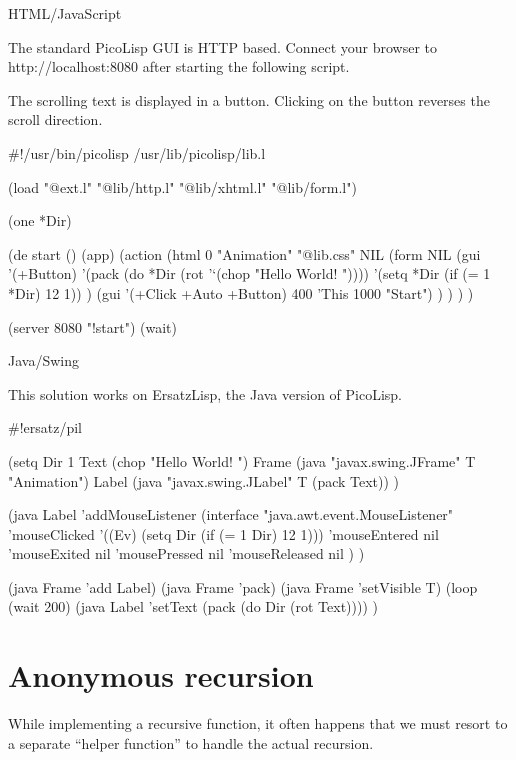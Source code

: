 \begin{wideverbatim}

HTML/JavaScript

The standard PicoLisp GUI is HTTP based. Connect your browser to
http://localhost:8080 after starting the following script.

The scrolling text is displayed in a button. Clicking on the button
reverses the scroll direction.

#!/usr/bin/picolisp /usr/lib/picolisp/lib.l

(load "@ext.l" "@lib/http.l" "@lib/xhtml.l" "@lib/form.l")

(one *Dir)

(de start ()
   (app)
   (action
      (html 0 "Animation" "@lib.css" NIL
         (form NIL
            (gui '(+Button)
               '(pack (do *Dir (rot '`(chop "Hello World! "))))
               '(setq *Dir (if (= 1 *Dir) 12 1)) )
            (gui '(+Click +Auto +Button) 400 'This 1000 "Start") ) ) ) )

(server 8080 "!start")
(wait)

\end{wideverbatim}

\begin{wideverbatim}

Java/Swing

This solution works on ErsatzLisp, the Java version of PicoLisp.

#!ersatz/pil

(setq
   Dir 1
   Text (chop "Hello World! ")
   Frame (java "javax.swing.JFrame" T "Animation")
   Label (java "javax.swing.JLabel" T (pack Text)) )

(java Label 'addMouseListener
   (interface "java.awt.event.MouseListener"
      'mouseClicked '((Ev) (setq Dir (if (= 1 Dir) 12 1)))
      'mouseEntered nil
      'mouseExited nil
      'mousePressed nil
      'mouseReleased nil ) )

(java Frame 'add Label)
(java Frame 'pack)
(java Frame 'setVisible T)
(loop
   (wait 200)
   (java Label 'setText (pack (do Dir (rot Text)))) )

\end{wideverbatim}

\pagebreak{}
\section*{Anonymous recursion}


While implementing a recursive function, it often happens that we must
resort to a separate ``helper function'' to handle the actual recursion.

